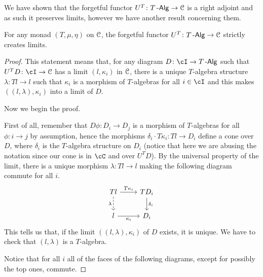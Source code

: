 \documentclass[a4paper,11pt,oneside,openany]{scrbook}
\begin{document}
We have shown that the forgetful functor $U^T\colon T\operatorname{-\mathsf{Alg}}\rightarrow\operatorname{\mathcal{C}}$ is a
right adjoint and as such it preserves limits, however we have another result
concerning them.

\begin{prop}\label{create lims}
	For any monad $(T,\mu,\eta)$ on $\operatorname{\mathcal{C}}$, the forgetful functor $U^T\colon T\operatorname{-\mathsf{Alg}}\rightarrow\operatorname{\mathcal{C}}$ strictly creates limits.
\end{prop}

\begin{proof}
	This statement means that, for any diagram $D\colon\cI\rightarrow T\Alg$
	such that $U^TD\colon\cI\rightarrow\C$ has a limit $(l,\kappa_i)$ in $\operatorname{\mathcal{C}}$,
	there is a unique $T$-algebra structure $\lambda\colon Tl\rightarrow l$ such
	that $\kappa_i$ is a morphism of $T$-algebras for all $i\in\cI$ and this
	makes $((l,\lambda),\kappa_i)$ into a limit of $D$.

	Now we begin the proof.

	First of all, remember that $D\phi\colon D_i\rightarrow D_j$ is a morphism
	of $T$-algebras for all $\phi\colon i\rightarrow j$ by assumption, hence the
	morphisms $\delta_i\cdot T\kappa_i\colon Tl\rightarrow D_i$ define a cone
	over $D$, where $\delta_i$ is the $T$-algebra structure on $D_i$ (notice
	that here we are abusing the notation since our cone is in $\cC$ and over
	$U^TD$). By the
	universal property of the limit, there is a unique morphism $\lambda\colon
		Tl\rightarrow l$ making the following diagram commute for all $i$.
	\[
		\begin{tikzcd}
			Tl\ar[d, dashed, "\lambda"'] \ar[r, "T\kappa_i"]
			& TD_i\ar[d, "\delta_i"]\\
			l\ar[r, "\kappa_i"']
			& D_i
		\end{tikzcd}
	\]
	This tells us that, if the limit $((l,\lambda),\kappa_i)$ of $D$ exists, it
	is unique. We have to check that $(l,\lambda)$ is a $T$-algebra.

	Notice that for all $i$ all of the faces of the following diagrams, except
	for possibly the top ones, commute.


\end{proof}
\end{document}
